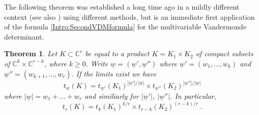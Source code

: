 \documentclass[10pt]{amsart}
\newtheorem{thm}{Theorem}[section]
\theoremstyle{definition}
\theoremstyle{remark}
\numberwithin{equation}{section}
\newcommand{\C}{\mathbb C}
\newcommand{\0}{\color{blue}{\mathsf{0}}}
\begin{document}
The following theorem was established a long time ago \cite{SchifferSiciak}  in a mildly different context (see also \cite{BloomCalvi}) using different methods, but is an immediate first application of the formula \eqref{Intro:SecondVDMformula} for the multivariable Vandermonde determinant. 
\begin{thm}
Let $K\subset \C^r$ be equal to a product $K= K_1\times K_2$ of compact subsets of $\C^{k} \times \C^{r-k}$, where $k\geq 0$. 
Write $\underline{w} = ( \underline{w}', \underline{w}'')$ where 
$\underline{w}' = (w_1,\ldots, w_k)$ and  $ \underline{w}'' = (w_{k+1},\ldots, w_r).$ If the limits exist we have
\[   t_{\underline{w}}(K) = t_{\underline{w}'}(K_1)^{|\underline{w}'|/|\underline{w}|} \times t_{\underline{w}''}(K_2)^{|\underline{w}''|/|\underline{w}|}  \]
 where $|\underline{w}| = w_1+ \ldots+ w_r$ and similiarly for $|\underline{w}'|$, $|\underline{w}''|$. 
In particular, 
\[ t_r(K) = t_k(K_1)^{k/r} \times t_{r-k}(K_2)^{(r-k)/r}  \ . \]
\end{thm}
\end{document}
